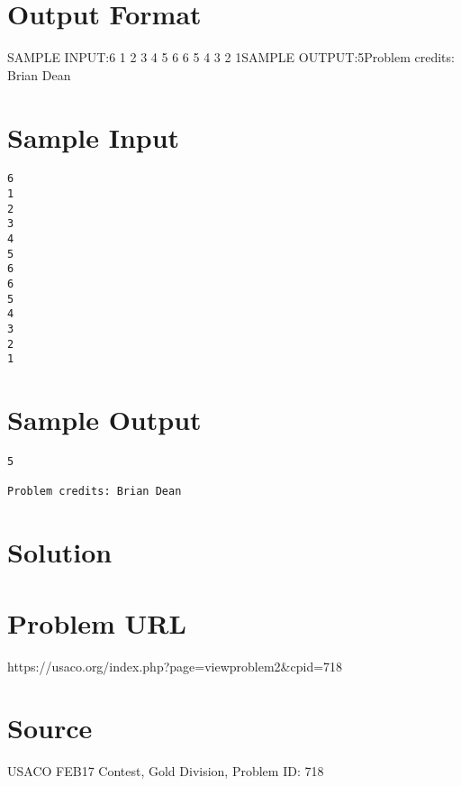 \documentclass[12pt]{article}
\begin{document}
\section*{Output Format}
SAMPLE INPUT:6
1
2
3
4
5
6
6
5
4
3
2
1SAMPLE OUTPUT:5Problem credits: Brian Dean

\section*{Sample Input}
\begin{verbatim}
6
1
2
3
4
5
6
6
5
4
3
2
1
\end{verbatim}

\section*{Sample Output}
\begin{verbatim}
5

Problem credits: Brian Dean
\end{verbatim}

\section*{Solution}


\section*{Problem URL}
https://usaco.org/index.php?page=viewproblem2&cpid=718

\section*{Source}
USACO FEB17 Contest, Gold Division, Problem ID: 718
\end{document}

